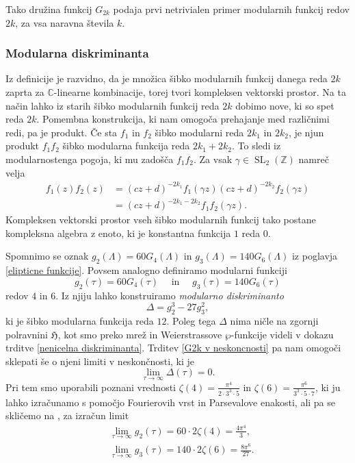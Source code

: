 \documentclass[mat1]{fmfdelo}
\numberwithin{equation}{section}
\newcommand{\Z}{\mathbb Z}
\newcommand{\C}{\mathbb C}
\newcommand{\HH}{\mathfrak{H}}
\theoremstyle{definition}
\begin{document}
Tako družina funkcij $G_{2k}$ podaja prvi netrivialen primer modularnih funkcij redov $2k$, za vsa naravna števila $k$.


\subsubsection*{Modularna diskriminanta}
Iz definicije je razvidno, da je množica šibko modularnih funkcij danega reda $2k$ zaprta za $\C$-linearne kombinacije, torej tvori kompleksen vektorski prostor. Na ta način lahko iz starih šibko modularnih funkcij reda $2k$ dobimo nove, ki so spet reda $2k$. Pomembna konstrukcija, ki nam omogoča prehajanje med različnimi redi, pa je produkt. Če sta $f_1$ in $f_2$ šibko modularni reda $2k_1$ in $2k_2$, je njun produkt $f_1f_2$ šibko modularna funkcija reda $2k_1 + 2k_2$. To sledi iz modularnostenga pogoja, ki mu zadošča $f_1f_2$. Za vsak $\gamma \in \operatorname{SL}_2(\Z)$ namreč velja
\begin{align*}
    f_1(z)f_2(z) &= 
    (cz + d)^{-2k_1} f_1\left(\gamma z\right)(cz + d)^{-2k_2} f_2\left(\gamma z\right) \\
    &= (cz + d)^{-2k_1 - 2k_2} f_1f_2\left(\gamma z\right).
\end{align*}
Kompleksen vektorski prostor vseh šibko modularnih funkcij tako postane kompleksna algebra z enoto, ki je konstantna funkcija $1$ reda $0$.

Spomnimo se oznak $g_2(\Lambda) = 60G_4(\Lambda)$ in $g_3(\Lambda) = 140G_6(\Lambda)$ iz poglavja \ref{elipticne funkcije}. Povsem analogno definiramo modularni funkciji
\[
    g_2(\tau) = 60G_4(\tau) \quad \text{ in } \quad g_3(\tau) = 140G_6(\tau)
\]
redov $4$ in $6$. Iz njiju lahko konstruiramo \emph{modularno diskriminanto}
\[
    \Delta = g_2^3 - 27g_3^2,
\]
ki je šibko modularna funkcija reda $12$. Poleg tega $\Delta$ nima ničle na zgornji polravnini $\HH$, kot smo preko mrež in Weierstrassove $\wp$-funkcije videli v dokazu trditve \ref{nenicelna diskriminanta}. Trditev \ref{G2k v neskoncnosti} pa nam omogoči sklepati še o njeni limiti v neskončnosti, ki je 
\[
    \lim_{\tau \to \infty} \Delta(\tau) = 0.
\]
Pri tem smo uporabili poznani vrednosti $\zeta(4) = \frac{\pi^4}{2\cdot3^3\cdot5}$ in $\zeta(6) = \frac{\pi^6}{3^3\cdot5\cdot7}$, ki ju lahko izračunamo s pomočjo Fourierovih vrst in Parsevalove enakosti, ali pa se skličemo na \cite[VII, \S4.1]{Serre}, za izračun limit
\begin{align*}
    &\lim_{\tau \to \infty} g_2(\tau) = 60\cdot2 \zeta(4) = \frac{4\pi^4}{3},\\
    &\lim_{\tau \to \infty} g_3(\tau) = 140\cdot2 \zeta(6) = \frac{8\pi^6}{27}.
\end{align*}
\end{document}
